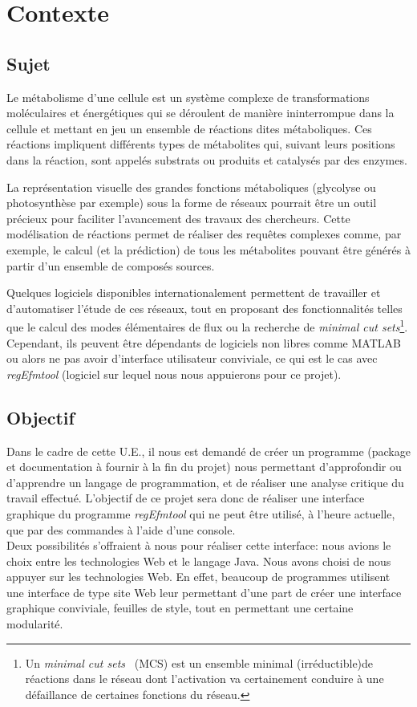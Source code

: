 \section{Contexte}

\subsection{Sujet}
Le métabolisme d'une cellule est un système complexe de transformations moléculaires et énergétiques qui se déroulent de manière ininterrompue dans la cellule et mettant en jeu un ensemble de réactions dites métaboliques. 
Ces réactions impliquent différents types de métabolites qui, suivant leurs positions dans la réaction, sont appelés substrats ou produits et catalysés par des enzymes.

La représentation visuelle des grandes fonctions métaboliques (glycolyse ou photosynthèse par exemple) sous la forme de réseaux pourrait être un outil précieux pour faciliter l'avancement des travaux des chercheurs. Cette modélisation de réactions permet de réaliser des requêtes complexes comme, par exemple, le calcul (et la prédiction) de tous les métabolites pouvant être générés à partir d'un ensemble de composés sources.

Quelques logiciels disponibles internationalement permettent de travailler et d'automatiser l'étude de ces réseaux, tout en proposant des fonctionnalités telles que le calcul des modes élémentaires de flux ou la recherche de \textit{minimal cut sets}\footnote{Un \textit{minimal cut sets}~\cite{mcs:url} (MCS) est un ensemble minimal (irréductible)de réactions dans le réseau dont l'activation va certainement conduire à une défaillance de certaines fonctions du réseau.}.  Cependant, ils peuvent être dépendants de logiciels non libres comme MATLAB ou alors ne pas avoir d'interface utilisateur conviviale, ce qui est le cas avec  \emph{regEfmtool} (logiciel sur lequel nous nous appuierons pour ce projet).

\subsection{Objectif}
Dans le cadre de cette U.E., il nous est demandé de créer un programme (package et documentation à fournir à la fin du projet) nous permettant d'approfondir ou d'apprendre un langage de programmation, et de réaliser une analyse critique du travail effectué. L'objectif de ce projet sera donc de réaliser une interface graphique du programme  \emph{regEfmtool} qui ne peut être utilisé, à l'heure actuelle, que par des commandes à l'aide d'une console. \\

Deux possibilités s'offraient à nous pour réaliser cette interface: nous avions le choix entre les technologies Web et le langage Java. Nous avons choisi de nous appuyer sur les technologies Web. En effet, beaucoup de programmes utilisent une interface de type site Web leur permettant d'une part de créer une interface graphique conviviale, feuilles de style, tout en permettant une certaine modularité. 